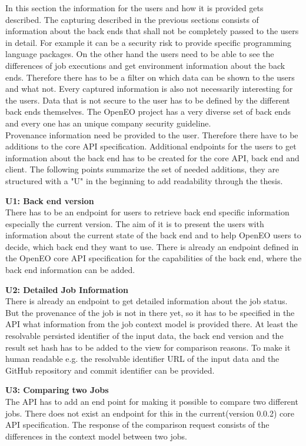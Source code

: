 \documentclass[draft,final]{vutinfth} %
\begin{document}
In this section the information for the users and how it is provided gets described. The capturing described in the previous sections consists of information about the back ends that shall not be completely passed to the users in detail. For example it can be a security risk to provide specific programming language packages. On the other hand the users need to be able to see the differences of job executions and get environment information about the back ends. Therefore there has to be a filter on which data can be shown to the users and what not. Every captured information is also not necessarily interesting for the users. Data that is not secure to the user has to be defined by the different back ends themselves. The OpenEO project has a very diverse set of back ends and every one has an unique company security guideline.\\ 
Provenance information need be provided to the user. Therefore there have to be additions to the core API specification. Additional endpoints for the users to get information about the back end has to be created for the core API, back end and client. The following points summarize the set of needed additions, they are structured with a "U" in the beginning to add readability through the thesis. 

\textbf{U1: Back end version} \\
There has to be an endpoint for users to retrieve back end specific information especially the current version. The aim of it is to present the users with information about the current state of the back end and to help OpenEO users to decide, which back end they want to use. There is already an endpoint defined in the OpenEO core API specification for the capabilities of the back end, where the back end information can be added. 

\textbf{U2: Detailed Job Information} \\
There is already an endpoint to get detailed information about the job status. But the provenance of the job is not in there yet, so it has to be specified in the API what information from the job context model is provided there. At least the resolvable persisted identifier of the input data, the back end version and the result set hash has to be added to the view for comparison reasons. To make it human readable e.g. the resolvable identifier URL of the input data and the GitHub repository and commit identifier can be provided.   

\textbf{U3: Comparing two Jobs} \\
The API has to add an end point for making it possible to compare two different jobs. There does not exist an endpoint for this in the current(version 0.0.2) core API specification. The response of the comparison request consists of the differences in the context model between two jobs. 
\end{document}

